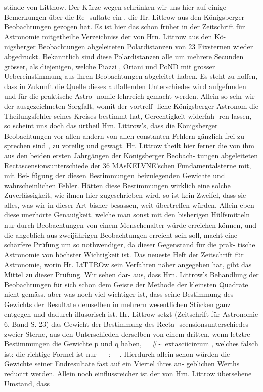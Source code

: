\documentclass[12pt,a4paper]{article}
\begin{document}
{{{{{{{{stände  von  Litthow.  Der  Kürze  wegen  schränken  wir  uns  hier  auf  einige  Bemerkungen  über  die  Re- sultate ein ,  die  Hr.  Littrow  aus  den  Königsberger  Beobachtungen  gezogen  hat.  Es  ist  hier  das  schon früher  in  der  Zeitschrift  für  Astronomie  mitgetheilte  Verzeichniss  der  von  Hrn.  Littrow  aus  den  Kö- nigsberger Beobachtungen  abgeleiteten  Polardistanzen  von  23  Fixsternen  wieder  abgedruckt.  Bekanntlich sind  diese  Polardistanzen  alle  um  mehrere  Secunden  grösser,  als  diejenigen,  welche  Piazzi  ,  Oriani  und PoND  mit  grosser  Uebereinstimmung  aus  ihren  Beobachtungen  abgeleitet  haben.  Es  steht  zu  hoffen,  dass in  Zukunft  die  Quelle  dieses  auffallenden  Unterschiedes  wird  aufgefunden  und  für  die  praktische  Astro- nomie lehrreich  gemacht  werden.  Allein  so  sehr  wir  der  ausgezeichneten  Sorgfalt,  womit  der  vortreff- liche Königsberger  Astronom  die  Theilungsfehler  seines  Kreises  bestimmt  hat,  Gerechtigkeit  widerfah- ren lassen,  so  scheint  uns  doch  das  ürtheil  Hrn.  Littrow's,  dass  die  Königsberger  Beobachtungen  vor allen  andern  von  allen  constanten  Fehlern  gänzlich  frei  zu  sprechen  sind ,  zu  voreilig  und  gewagt.  Hr. Littrow  theilt  hier  ferner  die  von  ihm  aus  den  beiden  ersten  Jahrgängen  der  Königsberger  Beobach- tungen abgeleiteten  Rectascensionsunterschiede  der  36  MAsKELVNE'schen  Fundamentalsterne  mit,  mit  Bei- fügung der  diesen  Bestimmungen  beizulegenden  Gewichte  und  wahrscheinlichen  Fehler.  Hätten  diese Bestimmungen  wirklich  eine  solche  Zuverlässigkeit,  wie  ihnen  hier  zugeschrieben  wird,  so  ist  kein Zweifel,  dass  sie  alles,  was  wir  in  dieser  Art  bisher  besassen,  weit  übertreffen  würden.  Allein  eben  diese unerhörte  Genauigkeit,  welche  man  sonst  mit  den  bisherigen  Hülfsmitteln  nur  durch  Beobachtungen von  einem  Menschenalter  würde  erreichen  können,  und  die  angeblich  aus  zweijährigen  Beobachtungen erreicht  sein  soll,  macht  eine  schärfere  Prüfung  um  so  nothwendiger,  da  dieser  Gegenstand  für  die  prak- tische Astronomie  von  höchster  Wichtigkeit  ist.  Das  neueste  Heft  der  Zeitschrift  für  Astronomie,  worin Hr.  LtTTROw  sein  Verfahren  näher  angegeben  hat,  gibt  das  Mittel  zu  dieser  Prüfung.  Wir  sehen  dar- aus, dass  Hrn.  Littrow's  Behandlung  der  Beobachtungen  für  sich  schon  dem  Geiste  der  Methode  der kleinsten  Quadrate  nicht  gemäss,  aber  was  noch  viel  wichtiger  ist,  dass  seine  Bestimmung  des  Gewichts der  Resultate  demselben  in  mehrern  wesentlichen  Stücken  ganz  entgegen  und  dadurch  illusorisch  ist. Hr.  Littrow  setzt  (Zeitschrift  für  Astronomie  6.  Band  S.  23)  das  Gewicht  der  Bestimmung  des  Recta- scensionsunterschiedes  zweier  Sterne,  aus  den  Unterschieden  derselben  von  einem  dritten,  wenn  letztre Bestimmungen  die  Gewichte  p  und  q  haben,  =  \#\textasciitilde{}\	extasciicircum{}{ },  welches  falsch  ist:  die  richtige  Formel  ist  nur --- :--- .  Hierdurch  allein  schon  würden  die  Gewichte  seiner  Endresultate  fast  auf  ein  Viertel  ihres  an- geblichen  Werths  reducirt  werden.  Allein  noch  einflussreicher  ist  der  von  Hrn.  Littrow  übersehene Umstand,  dass  }}}}}}}}
\end{document}
